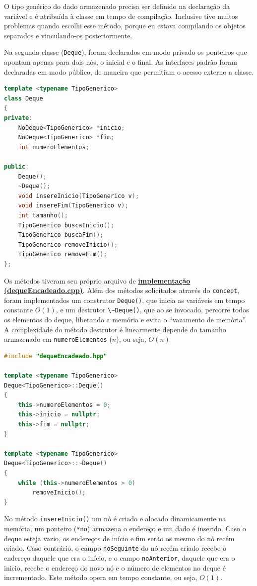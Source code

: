 \documentclass[
  brazilian,
  paper=a4,
  oneside  ,captions=tableheading
]{scrbook}
\newcommand{\passthrough}[1]{#1}
\begin{document}
O tipo genérico do dado armazenado precisa ser definido na declaração da
variável e é atribuída à classe em tempo de compilação. Inclusive tive
muitos problemas quando escolhi esse método, porque eu estava compilando
os objetos separados e vinculando-os posteriormente.

Na segunda classe (\passthrough{\lstinline!Deque!}), foram declarados em
modo privado os ponteiros que apontam apenas para dois nós, o inicial e
o final. As interfaces padrão foram declaradas em modo público, de
maneira que permitiam o acesso externo a classe.

\begin{lstlisting}[language={C++}]
template <typename TipoGenerico>
class Deque 
{
private:
    NoDeque<TipoGenerico> *inicio;
    NoDeque<TipoGenerico> *fim;
    int numeroElementos;

public:
    Deque();
    ~Deque();
    void insereInicio(TipoGenerico v);
    void insereFim(TipoGenerico v);
    int tamanho();
    TipoGenerico buscaInicio();
    TipoGenerico buscaFim();
    TipoGenerico removeInicio();
    TipoGenerico removeFim();
};
\end{lstlisting}

Os métodos tiveram seu próprio arquivo de
\href{https://github.com/ecostadelle/lista_pilhas_filas/blob/main/include/dequeEncadeado.cpp}{\textbf{implementação
(dequeEncadeado.cpp)}}. Além dos métodos solicitados através do
\passthrough{\lstinline!concept!}, foram implementados um construtor
\passthrough{\lstinline!Deque()!}, que inicia as variáveis em tempo
constante \(O(1)\), e um destrutor \passthrough{\lstinline!\~Deque()!},
que ao se invocado, percorre todos os elementos do deque, liberando a
memória e evita o ``vazamento de memória''. A complexidade do método
destrutor é linearmente depende do tamanho armazenado em
\passthrough{\lstinline!numeroElementos!} (\(n\)), ou seja, \(O(n)\)

\begin{lstlisting}[language={C++}]
#include "dequeEncadeado.hpp"

template <typename TipoGenerico>
Deque<TipoGenerico>::Deque()
{
    this->numeroElementos = 0;
    this->inicio = nullptr;
    this->fim = nullptr;
}

template <typename TipoGenerico>
Deque<TipoGenerico>::~Deque()
{
    while (this->numeroElementos > 0)
        removeInicio();
} 
\end{lstlisting}

No método \passthrough{\lstinline!insereInicio()!} um nó é criado e
alocado dinamicamente na memória, um ponteiro
(\passthrough{\lstinline!*no!}) armazena o endereço e um dado é
inserido. Caso o deque esteja vazio, os endereços de início e fim serão
os mesmo do nó recém criado. Caso contrário, o campo
\passthrough{\lstinline!noSeguinte!} do nó recém criado recebe o
endereço daquele que era o início, e o campo
\passthrough{\lstinline!noAnterior!}, daquele que era o inicio, recebe o
endereço do novo nó e o número de elementos no deque é incrementado.
Este método opera em tempo constante, ou seja, \(O(1)\).
\end{document}
